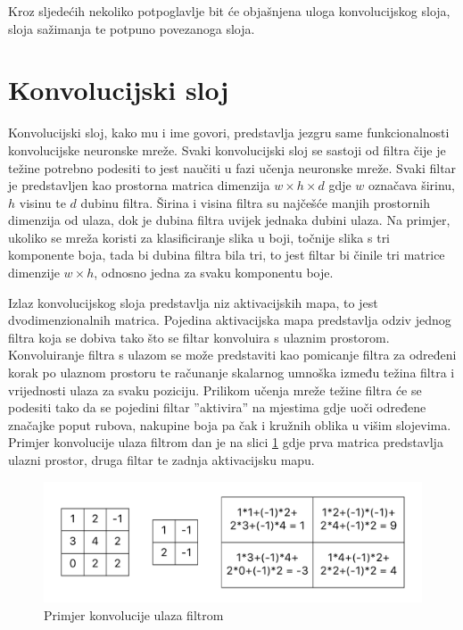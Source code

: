 Kroz sljedećih nekoliko potpoglavlje bit će objašnjena uloga konvolucijskog sloja, sloja sažimanja te potpuno povezanoga sloja.

\section{Konvolucijski sloj}

Konvolucijski sloj, kako mu i ime govori, predstavlja jezgru same funkcionalnosti konvolucijske neuronske mreže. Svaki konvolucijski sloj se sastoji od filtra čije je težine potrebno podesiti to jest naučiti u fazi učenja neuronske mreže. Svaki filtar je predstavljen kao prostorna matrica dimenzija $w \times h \times d$ gdje $w$ označava širinu, $h$ visinu te $d$ dubinu filtra. Širina i visina filtra su najčešće manjih prostornih dimenzija od ulaza, dok je dubina filtra uvijek jednaka dubini ulaza. Na primjer, ukoliko se mreža koristi za klasificiranje slika u boji, točnije slika s tri komponente boja, tada bi dubina filtra bila tri, to jest filtar bi činile tri matrice dimenzije $w \times h$, odnosno jedna za svaku komponentu boje.

Izlaz konvolucijskog sloja predstavlja niz aktivacijskih mapa, to jest dvodimenzionalnih matrica. Pojedina aktivacijska mapa predstavlja odziv jednog filtra koja se dobiva tako što se filtar konvoluira s ulaznim prostorom. Konvoluiranje filtra s ulazom se može predstaviti kao pomicanje filtra za određeni korak po ulaznom prostoru te računanje skalarnog umnoška između težina filtra i vrijednosti ulaza za svaku poziciju. Prilikom učenja mreže težine filtra će se podesiti tako da se pojedini filtar ''aktivira'' na mjestima gdje uoči određene značajke poput rubova, nakupine boja pa čak i kružnih oblika u višim slojevima. Primjer konvolucije ulaza filtrom dan je na slici \ref{fig:conv_example} gdje prva matrica predstavlja ulazni prostor, druga filtar te zadnja aktivacijsku mapu.

\begin{figure}[htb]
    \centering
    \includegraphics[width=14.5cm]{images/conv_example.pdf}
    \caption{Primjer konvolucije ulaza filtrom}
    \label{fig:conv_example}
\end{figure}

